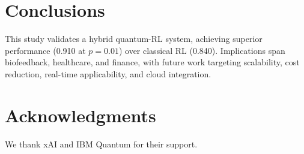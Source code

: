 \documentclass[12pt]{article}
\begin{document}
\section{Conclusions}
This study validates a hybrid quantum-RL system, achieving superior performance (0.910 at $p=0.01$) over classical RL (0.840). Implications span biofeedback, healthcare, and finance, with future work targeting scalability, cost reduction, real-time applicability, and cloud integration.

\section{Acknowledgments}
We thank xAI and IBM Quantum for their support.



\end{document}
